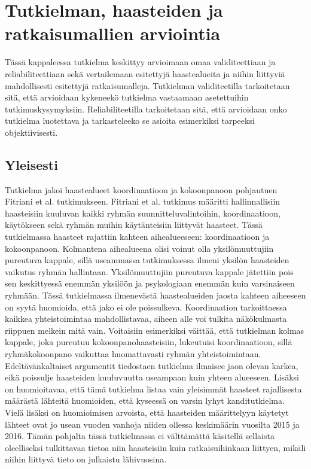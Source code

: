 \chapter{Tutkielman, haasteiden ja ratkaisumallien arviointia}

Tässä kappaleessa tutkielma keskittyy arvioimaan omaa validiteettiaan ja reliabiliteettiaan sekä vertailemaan esitettyjä haastealueita ja niihin liittyviä mahdollisesti esitettyjä ratkaisumalleja. Tutkielman validiteetilla tarkoitetaan sitä, että arvioidaan kykeneekö tutkielma vastaamaan asetettuihin tutkimuskysymyksiin. Reliabiliteetilla tarkoitetaan sitä, että arvioidaan onko tutkielma luotettava ja tarkasteleeko se asioita esimerkiksi tarpeeksi objektiivisesti.

\section{Yleisesti}

Tutkielma jakoi haastealueet koordinaatioon ja kokoonpanoon pohjautuen Fitriani et al. \cite{7872736} tutkimukseen. Fitriani et al. tutkimus määritti hallinnallisiin haasteisiin kuuluvan kaikki ryhmän suunnitteluvalintoihin, koordinaatioon, käytökseen sekä ryhmän muihin käytänteisiin liittyvät haasteet. Tässä tutkielmassa haasteet rajattiin kahteen aihealueeseen: koordinaatioon ja kokoonpanoon. Kolmantena aihealueena olisi voinut olla yksilömuuttujiin pureutuva kappale, sillä useammassa tutkimuksessa ilmeni yksilön haasteiden vaikutus ryhmän hallintaan. Yksilömuuttujiin pureutuva kappale jätettiin pois sen keskittyessä enemmän yksilöön ja psykologiaan enemmän kuin varsinaiseen ryhmään. Tässä tutkielmassa ilmenevästä haastealueiden jaosta kahteen aiheeseen on syytä huomioida, että jako ei ole poissulkeva. Koordinaation tarkoittaessa kaikkea yhteistoimintaa mahdollistavaa, aiheen alle voi tulkita näkökulmasta riippuen melkein mitä vain. Voitaisiin esimerkiksi väittää, että tutkielman kolmas kappale, joka pureutuu kokoonpanohaasteisiin, lukeutuisi koordinaatioon, sillä ryhmäkokoonpano vaikuttaa huomattavasti ryhmän yhteistoimintaan. Edeltävänkaltaiset argumentit tiedostaen tutkielma ilmaisee jaon olevan karkea, eikä poissulje haasteiden kuuluvuutta useampaan kuin yhteen alueeseen. Lisäksi on huomioitavaa, että tämä tutkielma listaa vain yleisimmät haasteet rajallisesta määrästä lähteitä huomioiden, että kyseessä on varsin lyhyt kanditutkielma. Vielä lisäksi on huomioimisen arvoista, että haasteiden määrittelyyn käytetyt lähteet ovat jo usean vuoden vanhoja niiden ollessa keskimäärin vuosilta 2015 ja 2016. Tämän pohjalta tässä tutkielmassa ei välttämättä käsitellä sellaista oleelliseksi tulkittavaa tietoa niin haasteisiin kuin ratkaisuihinkaan liittyen, mikäli niihin liittyvä tieto on julkaistu lähivuosina.

